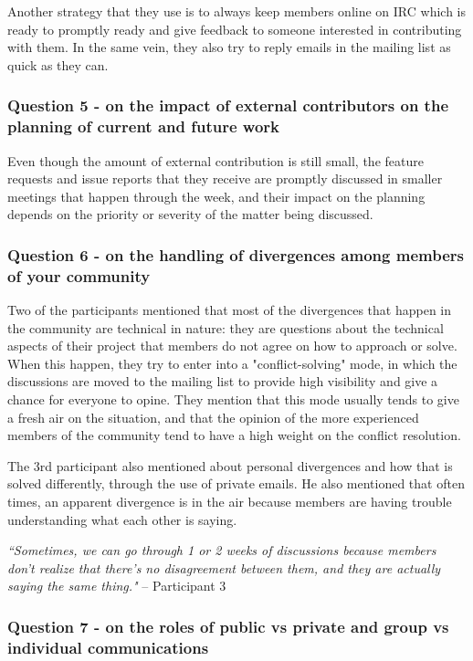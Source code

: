 \documentclass{sigchi}
\begin{document}
Another strategy that they use is to always keep members online on IRC which is ready to promptly ready and give feedback to someone interested in contributing with them. In the same vein, they also try to reply emails in the mailing list as quick as they can.

\subsubsection{Question 5 - on the impact of external contributors on the planning of current and future work}

Even though the amount of external contribution is still small, the feature requests and issue reports that they receive are promptly discussed in smaller meetings that happen through the week, and their impact on the planning depends on the priority or severity of the matter being discussed.

\subsubsection{Question 6 - on the handling of divergences among members of your community}
Two of the participants mentioned that most of the divergences that happen in the community are technical in nature: they are questions about the technical aspects of their project that members do not agree on how to approach or solve. When this happen, they try to enter into a "conflict-solving" mode, in which the discussions are moved to the mailing list to provide high visibility and give a chance for everyone to opine. They mention that this mode usually tends to give a fresh air on the situation, and that the opinion of the more experienced members of the community tend to have a high weight on the conflict resolution.

The 3rd participant also mentioned about personal divergences and how that is solved differently, through the use of private emails. He also mentioned that often times, an apparent divergence is in the air because members are having trouble understanding what each other is saying.

\begin{displayquote}
\textit{``Sometimes, we can go through 1 or 2 weeks of discussions because members don't realize that there's no disagreement between them, and they are actually saying the same thing."} – Participant 3
\end{displayquote}

\subsubsection{Question 7 - on the roles of public vs private and group vs individual communications}
\end{document}
